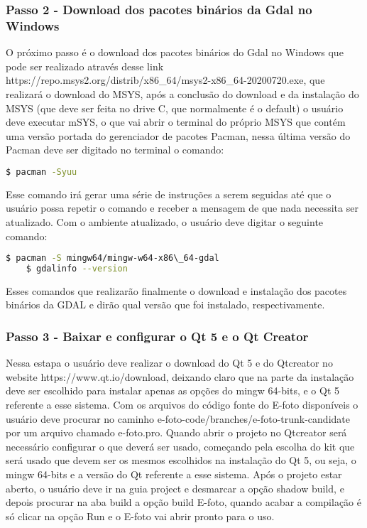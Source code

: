 \subsubsection{Passo 2 - Download dos pacotes binários da Gdal no Windows} 
 O próximo passo é o download dos pacotes binários do Gdal no Windows que pode ser realizado através desse link https://repo.msys2.org/distrib/x86\_64/msys2-x86\_64-20200720.exe, que realizará o download do MSYS, após a conclusão do download e da instalação do MSYS (que deve ser feita no drive C, que normalmente é o default) o usuário deve executar mSYS, o que vai abrir o terminal do próprio MSYS que contém uma versão portada do gerenciador de pacotes Pacman, nessa última versão do Pacman deve ser digitado no terminal o comando:
 \begin{lstlisting}[language=bash]
 	$ pacman -Syuu
 \end{lstlisting}

 Esse comando irá gerar uma série de instruções a serem seguidas até que o usuário possa repetir o comando e receber a mensagem de que nada necessita ser atualizado. Com o ambiente atualizado, o usuário deve digitar o seguinte comando:
  \begin{lstlisting}[language=bash]
 	$ pacman -S mingw64/mingw-w64-x86\_64-gdal
 	$ gdalinfo --version
 \end{lstlisting}

 Esses comandos que realizarão finalmente o download e instalação dos pacotes binários da GDAL e dirão qual versão que foi instalado, respectivamente. 
 
 \subsubsection{Passo 3 - Baixar e configurar o Qt 5 e o Qt Creator}
 Nessa estapa o usuário deve realizar o download do Qt 5 e do Qtcreator no website https://www.qt.io/download, deixando claro que na parte da instalação deve ser escolhido para instalar apenas as opções do mingw 64-bits, e o Qt 5 referente a esse sistema. Com os arquivos do código fonte do E-foto disponíveis o usuário deve procurar no caminho e-foto-code/branches/e-foto-trunk-candidate por um arquivo chamado e-foto.pro. Quando abrir o projeto no Qtcreator será necessário configurar o que deverá ser usado, começando pela escolha do kit que será usado que devem ser os mesmos escolhidos na instalação do Qt 5, ou seja, o mingw 64-bits e a versão do Qt referente a esse sistema. Após o projeto estar aberto, o usuário deve ir na guia project e desmarcar a opção shadow build, e depois procurar na aba build a opção build E-foto, quando acabar a compilação é só clicar na opção Run e o E-foto vai abrir pronto para o uso.